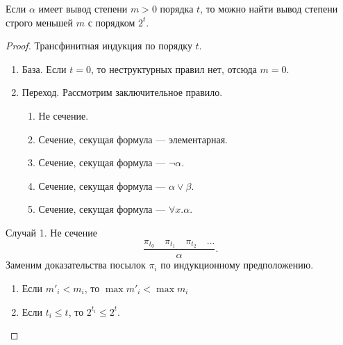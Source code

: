 \begin{theorem}Если $\alpha$ имеет вывод степени $m>0$ порядка $t$, то
можно найти вывод степени строго меньшей $m$ с порядком $2^t$.
\end{theorem}

\begin{proof}Трансфинитная индукция по порядку $t$.\begin{enumerate}
\item База. Если $t=0$, то неструктурных правил нет, отсюда $m = 0$.
\item Переход. Рассмотрим заключительное правило.
\begin{enumerate}
\item Не сечение.
\item Сечение, секущая формула --- элементарная.
\item Сечение, секущая формула --- $\neg\alpha$.
\item Сечение, секущая формула --- $\alpha\vee\beta$.
\item Сечение, секущая формула --- $\forall x.\alpha$.
\end{enumerate}
\end{enumerate}

{Случай 1. Не сечение}
\[\dfrac{\pi_{t_0}\quad\pi_{t_1}\quad\pi_{t_2}\quad\dots}{\alpha}.\]
Заменим доказательства посылок $\pi_i$ по индукционному предположению.

\begin{enumerate}
\item Если $m'_i < m_i$, то $\max m'_i < \max m_i$
\item Если $t_i \le t$, то $2^{t_i} \le 2^t$.
\end{enumerate}



\end{proof}
